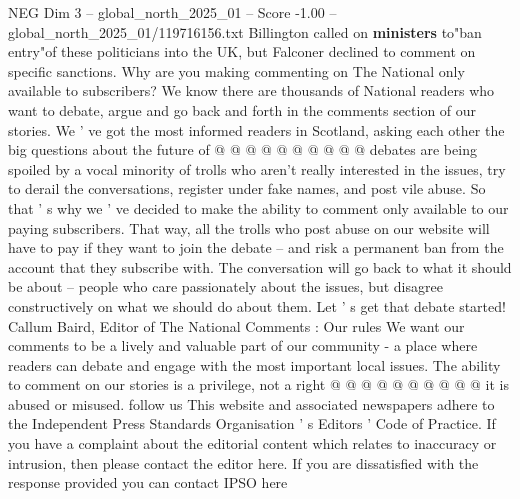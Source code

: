 \begin{textsample}{NEG Dim 3 – global\_north\_2025\_01 – Score -1.00 – global\_north\_2025\_01/119716156.txt}
Billington called on \textbf{ministers} to"ban entry"of these politicians into the UK, but Falconer declined to comment on specific sanctions.
Why are you making commenting on The National only available to subscribers?
We know there are thousands of National readers who want to debate, argue and go back and forth in the comments section of our stories.
We ' ve got the most informed readers in Scotland, asking each other the big questions about the future of @ @ @ @ @ @ @ @ @ @ debates are being spoiled by a vocal minority of trolls who aren't really interested in the issues, try to derail the conversations, register under fake names, and post vile abuse.
So that ' s why we ' ve decided to make the ability to comment only available to our paying subscribers.
That way, all the trolls who post abuse on our website will have to pay if they want to join the debate -- and risk a permanent ban from the account that they subscribe with.
The conversation will go back to what it should be about -- people who care passionately about the issues, but disagree constructively on what we should do about them.
Let ' s get that debate started!
Callum Baird, Editor of The National Comments : Our rules We want our comments to be a lively and valuable part of our community - a place where readers can debate and engage with the most important local issues.
The ability to comment on our stories is a privilege, not a right @ @ @ @ @ @ @ @ @ @ it is abused or misused. follow us This website and associated newspapers adhere to the Independent Press Standards Organisation ' s Editors ' Code of Practice.
If you have a complaint about the editorial content which relates to inaccuracy or intrusion, then please contact the editor here.
If you are dissatisfied with the response provided you can contact IPSO here

\end{textsample}
